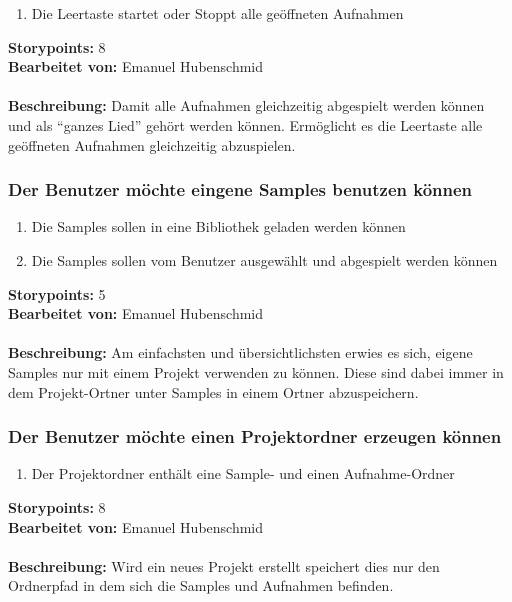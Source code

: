 \begin{enumerate}
 \item Die Leertaste startet oder Stoppt alle geöffneten Aufnahmen
\end{enumerate}

\textbf{Storypoints:} 8 \\
\textbf{Bearbeitet von:} Emanuel Hubenschmid \\
\\
\textbf{Beschreibung:} Damit alle Aufnahmen gleichzeitig abgespielt werden können und als ``ganzes 
Lied'' gehört werden können. Ermöglicht es die Leertaste alle geöffneten Aufnahmen gleichzeitig 
abzuspielen.


\subsubsection{Der Benutzer möchte eingene Samples benutzen können}

\begin{enumerate}
 \item Die Samples sollen in eine Bibliothek geladen werden können
 \item Die Samples sollen vom Benutzer ausgewählt und abgespielt werden können
\end{enumerate}

\textbf{Storypoints:} 5 \\
\textbf{Bearbeitet von:} Emanuel Hubenschmid \\
\\
\textbf{Beschreibung:} Am einfachsten und übersichtlichsten erwies es sich, eigene Samples nur mit 
einem Projekt verwenden zu können. Diese sind dabei immer in dem Projekt-Ortner unter Samples in 
einem Ortner abzuspeichern.


\subsubsection{Der Benutzer möchte einen Projektordner erzeugen können}

\begin{enumerate}
 \item Der Projektordner enthält eine Sample- und einen Aufnahme-Ordner
\end{enumerate}

\textbf{Storypoints:} 8 \\
\textbf{Bearbeitet von:} Emanuel Hubenschmid \\
\\
\textbf{Beschreibung:} Wird ein neues Projekt erstellt speichert dies nur den Ordnerpfad in dem 
sich die Samples und Aufnahmen befinden.


